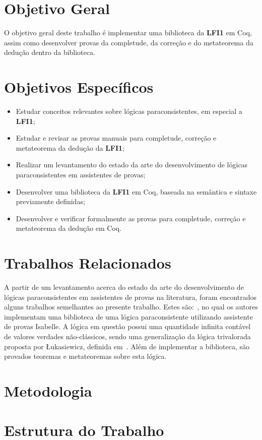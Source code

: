     \section{Objetivo Geral}
    O objetivo geral deste trabalho é implementar uma biblioteca da \textbf{LFI1} em Coq, assim como desenvolver provas da completude, da correção e do metateorema da dedução dentro da biblioteca.


    \section{Objetivos Específicos}
    \begin{itemize}
        \item Estudar conceitos relevantes sobre lógicas paraconsistentes, em especial a \textbf{LFI1};
        \item Estudar e revisar as provas manuais para completude, correção e metateorema da dedução da \textbf{LFI1};
        \item Realizar um levantamento do estado da arte do desenvolvimento de lógicas paraconsistentes em assistentes de provas;
        \item Desenvolver uma biblioteca da \textbf{LFI1} em Coq, baseada na semântica e sintaxe previamente definidas;
        \item Desenvolver e verificar formalmente as provas para completude, correção e metateorema da dedução em Coq.
    \end{itemize}


    \section{Trabalhos Relacionados}
    A partir de um levantamento acerca do estado da arte do desenvolvimento de lógicas paraconsistentes em assistentes de provas na literatura, foram encontrados alguns trabalhos semelhantes ao presente trabalho. Estes são:~\cite{Villadsen2017}, no qual os autores implementam uma biblioteca de uma lógica paraconsistente utilizando assistente de provas Isabelle. A lógica em questão possui uma quantidade infinita contável de valores verdades não-clássicos, sendo uma generalização da lógica trivalorada proposta por {\L}ukasiewicz, definida em~\cite{sep-lukasiewicz}. Além de implementar a biblioteca, são provados teoremas e metateoremas sobre esta lógica.


    \section{Metodologia}
        

    \section{Estrutura do Trabalho}
       